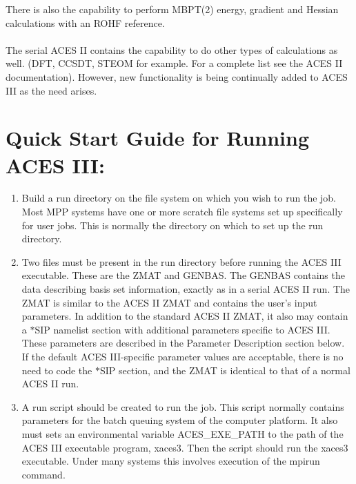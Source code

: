 \documentclass[12pt]{article}
\begin{document}
\noindent 
There is also the capability to perform MBPT(2) energy, gradient and Hessian calculations 
with an ROHF reference.\\ 
\\
The serial ACES II contains the capability to do other types of calculations as well. 
(DFT, CCSDT, STEOM for example. For a complete list see the ACES II documentation). 
However, new functionality is being continually added to ACES III 
as the need arises.

\section{\bf Quick Start Guide for Running ACES III:}

\begin{enumerate} 

\item Build a run directory on the file system on which you wish to run the job.  
         Most MPP systems have one or more scratch file systems set up specifically 
         for user jobs.  This is normally the directory on which to set up the run directory.

\item Two files must be present in the run directory before running the ACES III 
         executable.  These are the ZMAT and GENBAS.  The GENBAS contains the data 
         describing basis set information, exactly as in a serial ACES II run.  
         The ZMAT is similar to the ACES II ZMAT and contains the user's input parameters.  
         In addition to the standard ACES II ZMAT, it also may contain a $*$SIP namelist 
         section with  additional parameters specific to ACES III.  These parameters are 
         described in the Parameter Description section below.  If the default 
         ACES III-specific parameter values are acceptable, there is no need to code 
         the $*$SIP section, and the ZMAT is identical to that of a normal ACES II run.

\item A run script should be created to run the job. This script normally contains 
         parameters for the batch queuing system of the computer platform. It also must 
         sets an environmental variable ACES\_EXE\_PATH to the path of the ACES III executable 
         program, xaces3.  Then the script should run the xaces3 executable. Under many 
         systems this involves execution of the mpirun command. 

\end{enumerate} 
\end{document}
